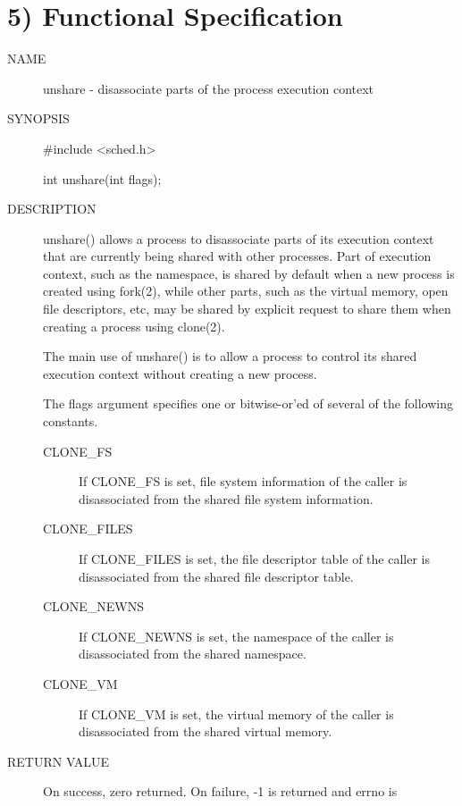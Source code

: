 \documentclass[a4paper,8pt,english]{sphinxmanual}
\begin{document}
\section{5) Functional Specification}
\label{userspace-api/unshare:functional-specification}\begin{description}
\item[{NAME}] \leavevmode
unshare - disassociate parts of the process execution context

\item[{SYNOPSIS}] \leavevmode
\#include \textless{}sched.h\textgreater{}

int unshare(int flags);

\item[{DESCRIPTION}] \leavevmode
unshare() allows a process to disassociate parts of its execution
context that are currently being shared with other processes. Part
of execution context, such as the namespace, is shared by default
when a new process is created using fork(2), while other parts,
such as the virtual memory, open file descriptors, etc, may be
shared by explicit request to share them when creating a process
using clone(2).

The main use of unshare() is to allow a process to control its
shared execution context without creating a new process.

The flags argument specifies one or bitwise-or'ed of several of
the following constants.
\begin{description}
\item[{CLONE\_FS}] \leavevmode
If CLONE\_FS is set, file system information of the caller
is disassociated from the shared file system information.

\item[{CLONE\_FILES}] \leavevmode
If CLONE\_FILES is set, the file descriptor table of the
caller is disassociated from the shared file descriptor
table.

\item[{CLONE\_NEWNS}] \leavevmode
If CLONE\_NEWNS is set, the namespace of the caller is
disassociated from the shared namespace.

\item[{CLONE\_VM}] \leavevmode
If CLONE\_VM is set, the virtual memory of the caller is
disassociated from the shared virtual memory.

\end{description}

\item[{RETURN VALUE}] \leavevmode
On success, zero returned. On failure, -1 is returned and errno is


\end{description}
\end{document}
